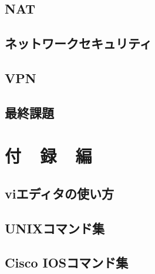 \documentclass[10pt]{text2002}
\begin{document}
\chapter{NAT}\label{ch:nat}


\chapter{ネットワークセキュリティ}\label{ch:security}


\chapter{VPN}\label{ch:vpn}


\chapter{最終課題}\label{ch:final}


\part{付~~録~~編}\label{part:appendix}
\appendix
\chapter{viエディタの使い方}\label{etc:vi}


\chapter{UNIXコマンド集}\label{etc:unixcmd}

%
%
%
\chapter{Cisco IOSコマンド集}\label{etc:ioscmd}


%

%

%
\end{document}
